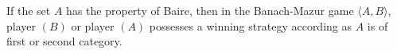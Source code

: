 If the set $A$ has the property of Baire, then in the Banach-Mazur game $\langle A, B \rangle$, player $(B)$ or player $(A)$ possesses a winning strategy according as $A$ is of first or second category.
